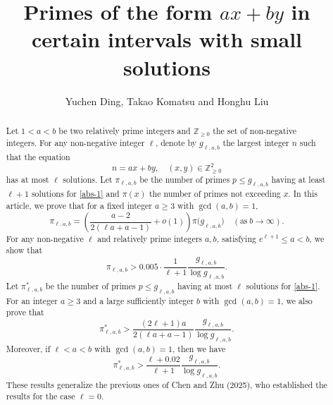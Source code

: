 \documentclass[12pt,a4paper,reqno]{amsart}
\numberwithin{equation}{section}
\def\Z{{\mathbb Z}}
\theoremstyle{plain}
\theoremstyle{definition}
\begin{document}
	\title
	[{Primes of the form $ax+by$ in certain intervals with small solutions}]
	{{Primes of the form $ax+by$ in certain  intervals with  small solutions}}
	\author
	[Y. Ding, T.  Komatsu and H. Liu]
	{Yuchen Ding, Takao Komatsu and Honghu Liu}
	
	
	\address{(Yuchen Ding) School of Mathematics, Yangzhou University, Yangzhou 225002, People's Republic of China}
	
	\address{(Takao Komatsu) Institute of Mathematics, Henan Academy of Sciences, Zhengzhou 450046, People's Republic of China?G Department of Mathematics, Institute of Science Tokyo, Meguro-ku, Tokyo 152-8551, Japan} 
	
	\address{(Honghu Liu) School of Mathematics, Yangzhou University, Yangzhou 225002, People's Republic of China}
	
	
	
	
	\begin{abstract}Let $1<a<b$ be two relatively prime integers and $\Z_{\geq 0}$ the set of non-negative integers. For any non-negative integer $\ell$, denote by $g_{\ell,a,b}$ the largest integer $n$ such that the equation 
	\begin{equation}\label{abs-1}
		n=ax+by,\quad  (x,y)\in\Z_{\geq 0}^{2} \tag{1}
	\end{equation}
	has at most $\ell$ solutions. Let $\pi_{\ell,a,b}$ be the number of primes $p\leq g_{\ell,a,b}$ having at least $\ell+1$ solutions for \eqref{abs-1} and $\pi(x)$ the number of primes not exceeding $x$. In this article, we prove that 
	for a fixed integer $a\ge 3$ with $\gcd(a,b)=1$, 
	$$
	\pi_{\ell,a,b}=\left(\frac{a-2}{2(\ell a+a-1)}+o(1)\right)\pi\bigl(g_{\ell,a,b}\bigr)\quad(\text{as}~ b\to\infty).
	$$ 
	For any non-negative $\ell$ and relatively prime integers $a,b$, satisfying $e^{\ell+1}\leq a<b$, we show that
	\begin{equation*}
		\pi_{\ell,a,b}>0.005\cdot \frac{1}{\ell+1}\frac{g_{\ell,a,b}}{\log g_{\ell,a,b}}.
	\end{equation*} 
	Let $\pi_{\ell,a,b}^{*}$ be the number of primes $p\leq g_{\ell,a,b}$ having at most $\ell$ solutions for \eqref{abs-1}.
	For an integer $a\ge 3$ and a large sufficiently integer $b$ with $\gcd(a,b)=1$, we also prove that
	$$   
	\pi^{*}_{\ell,a,b}>\frac{(2\ell+1)a}{2(\ell a+a-1)}\frac{g_{\ell,a,b}}{\log g_{\ell,a,b}}.
	$$ 
	Moreover, if  $\ell<a<b$ with $\gcd(a,b)=1$, then we have
		\begin{equation*}
		\pi^{*}_{\ell,a,b}>\frac{\ell+0.02}{\ell+1}\frac{g_{\ell,a,b}}{\log g_{\ell,a,b}}.
		\end{equation*}
These results generalize the previous ones of Chen and Zhu (2025), who established the results for the case $\ell=0$.

	\end{abstract}
	\maketitle
	
\end{document}
